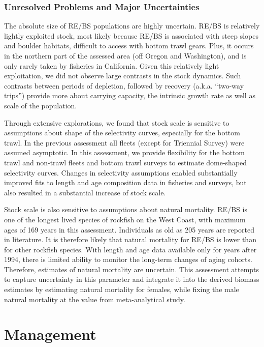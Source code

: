 \documentclass[
]{scrartcl}
\begin{document}
\subsubsection{Unresolved Problems and Major
Uncertainties}\label{unresolved-problems-and-major-uncertainties-1}

The absolute size of RE/BS populations are highly uncertain. RE/BS is
relatively lightly exploited stock, most likely because RE/BS is
associated with steep slopes and boulder habitats, difficult to access
with bottom trawl gears. Plus, it occurs in the northern part of the
assessed area (off Oregon and Washington), and is only rarely taken by
fisheries in California. Given this relatively light exploitation, we
did not observe large contrasts in the stock dynamics. Such contrasts
between periods of depletion, followed by recovery (a.k.a. ``two-way
trips'') provide more about carrying capacity, the intrinsic growth rate
as well as scale of the population.

Through extensive explorations, we found that stock scale is sensitive
to assumptions about shape of the selectivity curves, especially for the
bottom trawl. In the previous assessment all fleets (except for
Triennial Survey) were assumed asymptotic. In this assessment, we
provide flexibility for the bottom trawl and non-trawl fleets and bottom
trawl surveys to estimate dome-shaped selectivity curves. Changes in
selectivity assumptions enabled substantially improved fits to length
and age composition data in fisheries and surveys, but also resulted in
a substantial increase of stock scale.

Stock scale is also sensitive to assumptions about natural mortality.
RE/BS is one of the longest lived species of rockfish on the West Coast,
with maximum ages of 169 years in this assessment. Individuals as old as
205 years are reported in literature. It is therefore likely that
natural mortality for RE/BS is lower than for other rockfish species.
With length and age data available only for years after 1994, there is
limited ability to monitor the long-term changes of aging cohorts.
Therefore, estimates of natural mortality are uncertain. This assessment
attempts to capture uncertainty in this parameter and integrate it into
the derived biomass estimates by estimating natural mortality for
females, while fixing the male natural mortality at the value from
meta-analytical study.

\newpage{}

\section{Management}\label{management}
\end{document}
